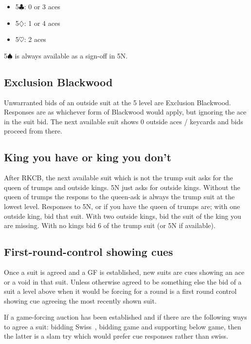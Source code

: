 \documentclass[a4paper,14pt]{extarticle}
\begin{document}
\begin{itemize}
\item 5$\clubsuit$: 0 or 3 aces
\item 5$\diamondsuit$: 1 or 4 aces
\item 5$\heartsuit$: 2 aces
\end{itemize}

5$\spadesuit$ is always available as a sign-off in 5N.

\newpage

\subsection{Exclusion Blackwood}
\label{sec:exclusion}

Unwarranted bids of an outside suit at the 5 level are Exclusion Blackwood.
Responses are as whichever form of Blackwood would apply, but ignoring the ace
in the suit bid. The next available suit shows 0 outside aces / keycards and
bids proceed from there.


\subsection{King you have or king you don't}
\label{sec:kyhokyd}

After RKCB, the next available suit which is not the trump suit asks for the
queen of trumps and outside kings. 5N just asks for outside kings. Without the
queen of trumps the respons to the queen-ask is always the trump suit at the
lowest level. Responses to 5N, or if you have the queen of trumps are; with one
outside king, bid that suit. With two outside kings, bid the suit of the king
you are missing. With no kings bid 6 of the trump suit (or 5N if available).

\subsection{First-round-control showing cues}
\label{sec:cues}

Once a suit is agreed and a GF is established, new suits are cues showing an
ace or a void in that suit. Unless otherwise agreed to be something else the
bid of a suit a level above when it would be forcing for a round is a first round
control showing cue agreeing the most recently shown suit.

If a game-forcing auction has been established and if there are the following
ways to agree a suit: bidding Swiss~, bidding game and
supporting below game, then the latter is a slam try which would prefer cue
responses rather than swiss.
\end{document}
